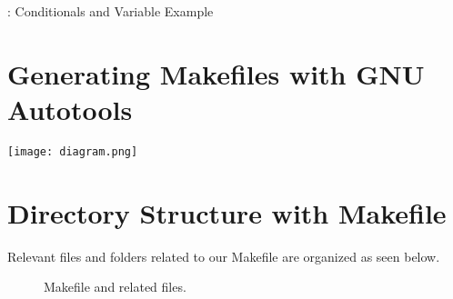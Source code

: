 \begin{mybox}{\thetcbcounter: Conditionals and Variable Example}
	
\end{mybox}

\section{Generating Makefiles with GNU Autotools}

\justifying
\texttt{[image: diagram.png]}

\section{Directory Structure with Makefile}

\justifying
Relevant files and folders related to our Makefile are organized as seen below.

\begin{figure}[!htb]
	
	\caption{Makefile and related files.}
\label{makefile}
\end{figure}

